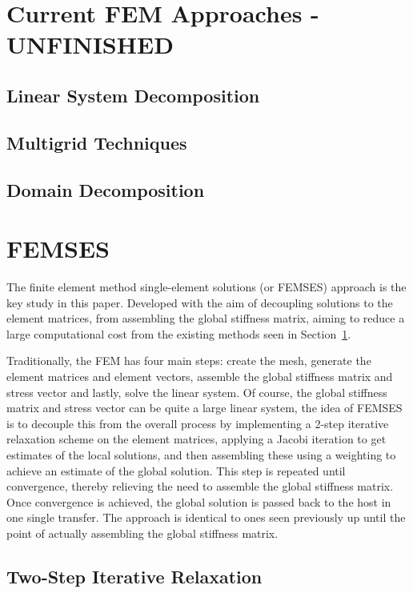 \section{Current FEM Approaches - UNFINISHED}\label{approaches}

\subsection{Linear System Decomposition}

\subsection{Multigrid Techniques}

\subsection{Domain Decomposition}

\section{FEMSES}

The finite element method single-element solutions (or FEMSES) approach is the key study in this paper. Developed with the aim of decoupling solutions to the element matrices, from assembling the global stiffness matrix, aiming to reduce a large computational cost from the existing methods seen in Section~\ref{approaches}.

Traditionally, the FEM has four main steps: create the mesh, generate the element matrices and element vectors, assemble the global stiffness matrix and stress vector and lastly, solve the linear system. Of course, the global stiffness matrix and stress vector can be quite a large linear system, the idea of FEMSES is to decouple this from the overall process by implementing a 2-step iterative relaxation scheme on the element matrices, applying a Jacobi iteration to get estimates of the local solutions, and then assembling these using a weighting to achieve an estimate of the global solution. This step is repeated until convergence, thereby relieving the need to assemble the global stiffness matrix. Once convergence is achieved, the global solution is passed back to the host in one single transfer. The approach is identical to ones seen previously up until the point of actually assembling the global stiffness matrix.

\subsection{Two-Step Iterative Relaxation}

